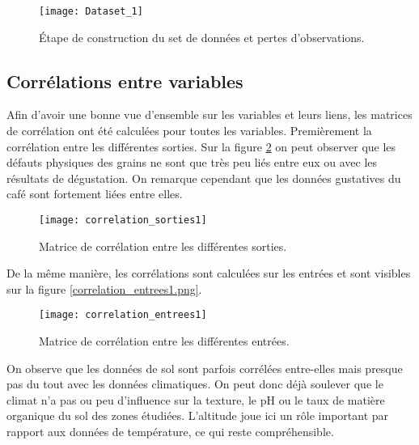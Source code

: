 \begin{figure}[H]
	\texttt{[image: Dataset\_1]}
	\caption{\label{DatasetMaking} Étape de construction du set de données et pertes d'observations.}
\end{figure}


\subsection{Corrélations entre variables}

Afin d'avoir une bonne vue d'ensemble sur les variables et leurs liens, les matrices de corrélation ont été calculées pour toutes les variables. Premièrement la corrélation entre les différentes sorties. Sur la figure \ref{correlation_sorties1} on peut observer que les défauts physiques des grains ne sont que très peu liés entre eux ou avec les résultats de dégustation. On remarque cependant que les données gustatives du café sont fortement liées entre elles. 

\begin{figure}[H]
	\texttt{[image: correlation\_sorties1]}
	\caption{\label{correlation_sorties1} Matrice de corrélation entre les différentes sorties.}
\end{figure}


De la même manière, les corrélations sont calculées sur les entrées et sont visibles sur la figure \ref{correlation_entrees1.png}. 


\begin{figure}[H]
	\texttt{[image: correlation\_entrees1]}
	\caption{\label{correlation_entrees1} Matrice de corrélation entre les différentes entrées.}
\end{figure}


On observe que les données de sol sont parfois corrélées entre-elles mais presque pas du tout avec les données climatiques. On peut donc déjà soulever que le climat n'a pas ou peu d'influence sur la texture, le pH ou le taux de matière organique du sol des zones étudiées. L'altitude joue ici un rôle important par rapport aux données de température, ce qui reste compréhensible. 












\newpage
